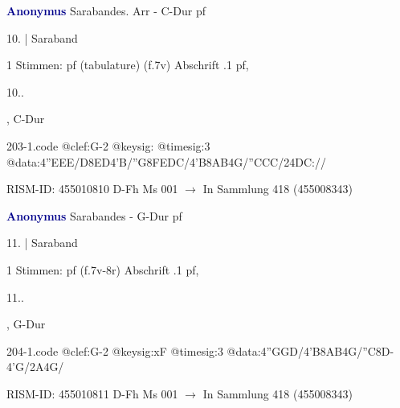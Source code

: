 \documentclass[twocolumn]{book}
\begin{document}
\newline \par \vspace{7pt} \textcolor{darkblue}{\textbf{Anonymus  }}
\newline Sarabandes. Arr - C-Dur
\newline pf
\newline \begin{itshape}[f.7v, at left:] 10. | Saraband\end{itshape} 
\newline \textcolor{darkblue}{}  1 Stimmen: pf (tabulature)  (f.7v)
\newline Abschrift
.1  pf, \begin{itshape}10..\end{itshape}, C-Dur  
\begin{filecontents*}{203-1.code}
@clef:G-2
@keysig:
@timesig:3
@data:4''EEE/D{8ED}4'B/''G{8FEDC}/4'B{8AB}4G/''CCC/24DC://
\end{filecontents*}
\newline
%
\newline RISM-ID: 455010810
\newline D-Fh  Ms 001
\newline $\rightarrow$ In Sammlung 418 (455008343)
      
\newline \par \vspace{7pt} \textcolor{darkblue}{\textbf{Anonymus  }}
\newline Sarabandes - G-Dur
\newline pf
\newline \begin{itshape}[f.7v, at left:] 11. | Saraband\end{itshape} 
\newline \textcolor{darkblue}{}  1 Stimmen: pf  (f.7v-8r)
\newline Abschrift
.1  pf, \begin{itshape}11..\end{itshape}, G-Dur  
\begin{filecontents*}{204-1.code}
@clef:G-2
@keysig:xF
@timesig:3
@data:4''GGD/4'B{8AB}4G/''C8D-4'G/2A4G/
\end{filecontents*}
\newline
%
\newline RISM-ID: 455010811
\newline D-Fh  Ms 001
\newline $\rightarrow$ In Sammlung 418 (455008343)
      
\end{document}
